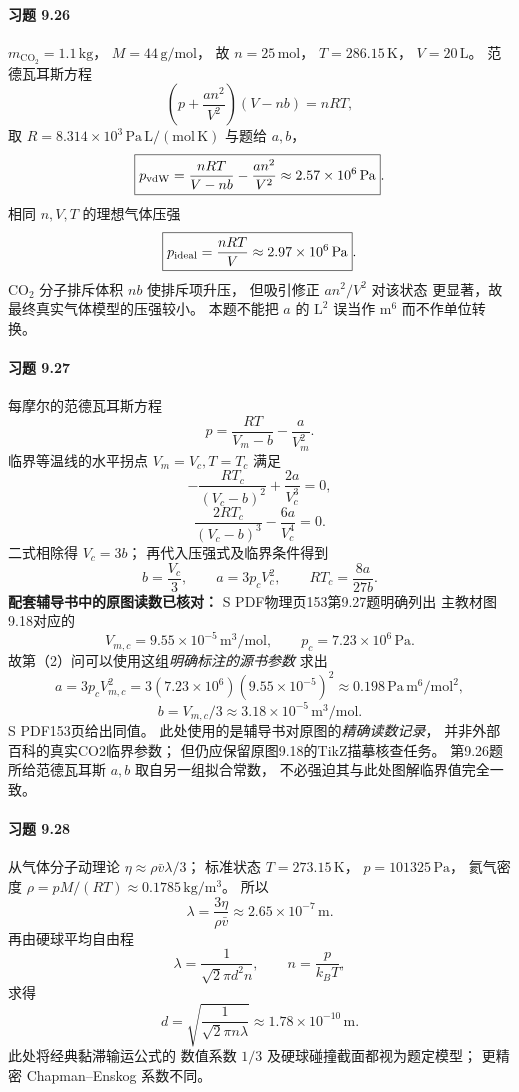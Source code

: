 \paragraph{习题 9.26}
\(m_{\mathrm{CO_2}}=1.1\,\mathrm{kg}\)，
\(M=44\,\mathrm{g/mol}\)，
故 \(n=25\,\mathrm{mol}\)，
\(T=286.15\,\mathrm K\)，
\(V=20\,\mathrm L\)。
范德瓦耳斯方程
\[
 \left(p+\frac{an^2}{V^2}\right)(V-nb)=nRT,
\]
取 \(R=8.314\times10^3\,
\mathrm{Pa\,L/(mol\,K)}\) 与题给 \(a,b\)，
\[
 \boxed{p_{\rm vdW}=
 \frac{nRT}{V-nb}-\frac{an^2}{V^2}
 \approx2.57\times10^6\,\mathrm{Pa}}.
\]
相同 \(n,V,T\) 的理想气体压强
\[
 \boxed{p_{\rm ideal}=\frac{nRT}{V}
 \approx2.97\times10^6\,\mathrm{Pa}}.
\]
\(\mathrm{CO_2}\) 分子排斥体积 \(nb\)
使排斥项升压，
但吸引修正 \(an^2/V^2\) 对该状态
更显著，故最终真实气体模型的压强较小。
本题不能把 \(a\) 的 \(\mathrm{L^2}\)
误当作 \(\mathrm{m^6}\) 而不作单位转换。

\paragraph{习题 9.27}
每摩尔的范德瓦耳斯方程
\[
 p=\frac{RT}{V_m-b}-\frac a{V_m^2}.
\]
临界等温线的水平拐点 \(V_m=V_c,T=T_c\) 满足
\[
 -\frac{RT_c}{(V_c-b)^2}+\frac{2a}{V_c^3}=0,
\]
\[
 \frac{2RT_c}{(V_c-b)^3}-\frac{6a}{V_c^4}=0.
\]
二式相除得
\(V_c=3b\)；
再代入压强式及临界条件得到
\[
 \boxed{b=\frac{V_c}{3}},\qquad
 \boxed{a=3p_cV_c^2},\qquad
 \boxed{RT_c=\frac{8a}{27b}}.
\]
\textbf{配套辅导书中的原图读数已核对：}
S PDF物理页153第9.27题明确列出
主教材图9.18对应的
\[
 V_{m,c}=9.55\times10^{-5}\,\mathrm{m^3/mol},
 \qquad
 p_c=7.23\times10^6\,\mathrm{Pa}.
\]
故第（2）问可以使用这组\emph{明确标注的源书参数}
求出
\[
 \boxed{a=3p_cV_{m,c}^2
 =3(7.23\times10^6)(9.55\times10^{-5})^2
 \approx0.198\,\mathrm{Pa\,m^6/mol^2}},
\]
\[
 \boxed{b=V_{m,c}/3
 \approx3.18\times10^{-5}\,\mathrm{m^3/mol}}.
\]
S PDF153页给出同值。
此处使用的是辅导书对原图的\emph{精确读数记录}，
并非外部百科的真实CO2临界参数；
但仍应保留原图9.18的TikZ描摹核查任务。
第9.26题所给范德瓦耳斯 \(a,b\)
取自另一组拟合常数，
不必强迫其与此处图解临界值完全一致。

\paragraph{习题 9.28}
从气体分子动理论
\(\eta\approx\rho\bar v\lambda/3\)；
标准状态 \(T=273.15\,\mathrm K\)，
\(p=101325\,\mathrm{Pa}\)，
氦气密度
\(\rho=pM/(RT)\approx0.1785\,\mathrm{kg/m^3}\)。
所以
\[
 \boxed{\lambda=\frac{3\eta}{\rho\bar v}
 \approx2.65\times10^{-7}\,\mathrm m}.
\]
再由硬球平均自由程
\[
 \lambda=\frac1{\sqrt2\pi d^2n},\qquad
 n=\frac p{k_BT},
\]
求得
\[
 \boxed{d=\sqrt{\frac1{\sqrt2\pi n\lambda}}
 \approx1.78\times10^{-10}\,\mathrm m}.
\]
此处将经典黏滞输运公式的
数值系数 \(1/3\) 及硬球碰撞截面都视为题定模型；
更精密 Chapman--Enskog 系数不同。

